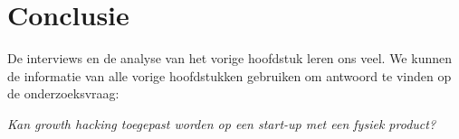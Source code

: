 
\chapter{Conclusie}
\label{ch:conclusie}


De interviews en de analyse van het vorige hoofdstuk leren ons veel. We kunnen de informatie van alle vorige hoofdstukken gebruiken om antwoord te vinden op de onderzoeksvraag:

\emph{Kan growth hacking toegepast worden op een start-up met een fysiek product?}

